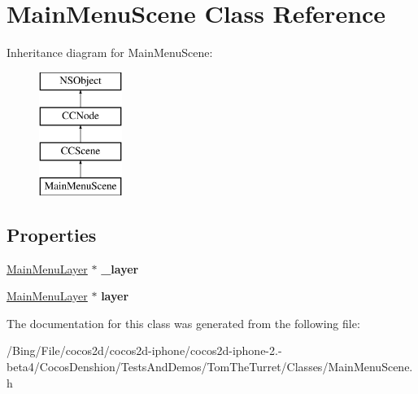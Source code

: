 \hypertarget{interface_main_menu_scene}{\section{Main\-Menu\-Scene Class Reference}
\label{interface_main_menu_scene}
}
Inheritance diagram for Main\-Menu\-Scene\-:\begin{figure}[H]
\begin{center}
\leavevmode
\includegraphics[height=4.000000cm]{interface_main_menu_scene}
\end{center}
\end{figure}
\subsection*{Properties}
\begin{DoxyCompactItemize}
\item 
\hypertarget{interface_main_menu_scene_a22667c0a7a30ca8e0512e8d45210758e}{\hyperlink{interface_main_menu_layer}{Main\-Menu\-Layer} $\ast$ {\bfseries \-\_\-layer}}\label{interface_main_menu_scene_a22667c0a7a30ca8e0512e8d45210758e}

\item 
\hypertarget{interface_main_menu_scene_aec721f216d2aa3994a6d4e69a05b288a}{\hyperlink{interface_main_menu_layer}{Main\-Menu\-Layer} $\ast$ {\bfseries layer}}\label{interface_main_menu_scene_aec721f216d2aa3994a6d4e69a05b288a}

\end{DoxyCompactItemize}


The documentation for this class was generated from the following file\-:\begin{DoxyCompactItemize}
\item 
/\-Bing/\-File/cocos2d/cocos2d-\/iphone/cocos2d-\/iphone-\/2.-\/beta4/\-Cocos\-Denshion/\-Tests\-And\-Demos/\-Tom\-The\-Turret/\-Classes/Main\-Menu\-Scene.\-h\end{DoxyCompactItemize}
